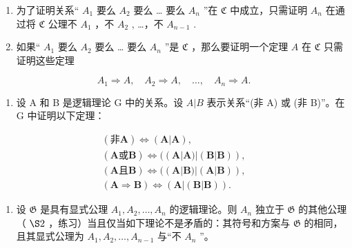 \begin{enumerate}
\def\labelenumi{(\alph{enumi})}
\item
  为了证明关系“ \(A_{1}\) 要么 \(A_{2}\) 要么 \ldots{} 要么 \(A_{n}\) ”在 \(\mathfrak{C}\) 中成立，只需证明 \(A_{n}\) 在通过将 \(\mathfrak{C}\) 公理不 \(A_{1}\) ，不 \(A_{2}\) , \ldots，不 \(A_{n-1}\) .
\item
  如果“ \(A_{1}\) 要么 \(A_{2}\) 要么 \ldots{} 要么 \(A_{n}\) ”是 \(\mathfrak{C}\) ，那么要证明一个定理 \(A\) 在 \(\mathfrak{C}\) 只需证明这些定理
\end{enumerate}

\[
A _ {1} \Longrightarrow A, \quad A _ {2} \Longrightarrow A, \quad \dots , \quad A _ {n} \Longrightarrow A.
\]

\begin{enumerate}
\def\labelenumi{\arabic{enumi}.}
\setcounter{enumi}{3}
\tightlist
\item
  设 A 和 B 是逻辑理论 G 中的关系。设 \(A|B\) 表示关系“(非 A) 或 (非 B)”。在 G 中证明以下定理：
\end{enumerate}

\[
\begin{array}{c} (\text {非} \boldsymbol {A}) \Longleftrightarrow (\boldsymbol {A} | \boldsymbol {A}), \\ (\boldsymbol {A} \text {或} \boldsymbol {B}) \Longleftrightarrow ((\boldsymbol {A} | \boldsymbol {A}) | (\boldsymbol {B} | \boldsymbol {B})), \\ (\boldsymbol {A} \text {且} \boldsymbol {B}) \Longleftrightarrow ((\boldsymbol {A} | \boldsymbol {B}) | (\boldsymbol {A} | \boldsymbol {B})), \\ (\boldsymbol {A} \Longrightarrow \boldsymbol {B}) \Longleftrightarrow (\boldsymbol {A} | (\boldsymbol {B} | \boldsymbol {B})). \end{array}
\]

\begin{enumerate}
\def\labelenumi{\arabic{enumi}.}
\setcounter{enumi}{4}
\tightlist
\item
  设 \(\mathfrak{G}\) 是具有显式公理 \(A_{1}, A_{2}, \ldots, A_{n}\) 的逻辑理论。则 \(A_{n}\) 独立于 \(\mathfrak{G}\) 的其他公理（ \(\S 2\) ，练习）当且仅当如下理论不是矛盾的：其符号和方案与 \(\mathfrak{G}\) 的相同，且其显式公理为 \(A_{1}, A_{2}, \ldots, A_{n-1}\) 与``不 \(A_{n}\) ''。
\end{enumerate}

